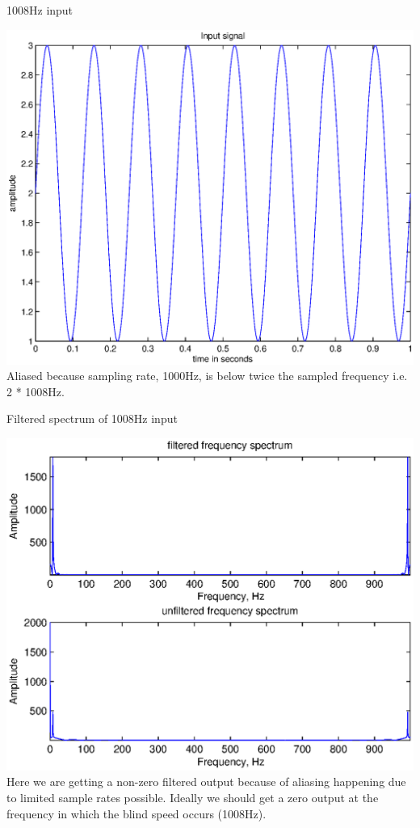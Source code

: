 \documentclass[mathserif]{beamer}
\begin{document}
    
    \begin{frame}{1008Hz input}
      \begin{minipage}[t][0.8\textheight][t]{\textwidth}
	\includegraphics[width=\linewidth]{inputSig1008Hz} \\
	\vfill
	\tiny{Aliased because sampling rate, 1000Hz, is below twice the sampled frequency i.e. 2 * 1008Hz.}
      \end{minipage}
    \end{frame}

    
    \begin{frame}{Filtered spectrum of 1008Hz input}
      \begin{minipage}[t][0.8\textheight][t]{\textwidth}
      \centering
      \includegraphics[width=0.7\linewidth]{freqSpec1008Hz} \\
	\vfill
	\tiny{Here we are getting a non-zero filtered output because of aliasing happening due to limited sample rates possible. Ideally we should get a zero output at the frequency in which the blind speed occurs (1008Hz).}
      \end{minipage}
    \end{frame}
    
\end{document}

